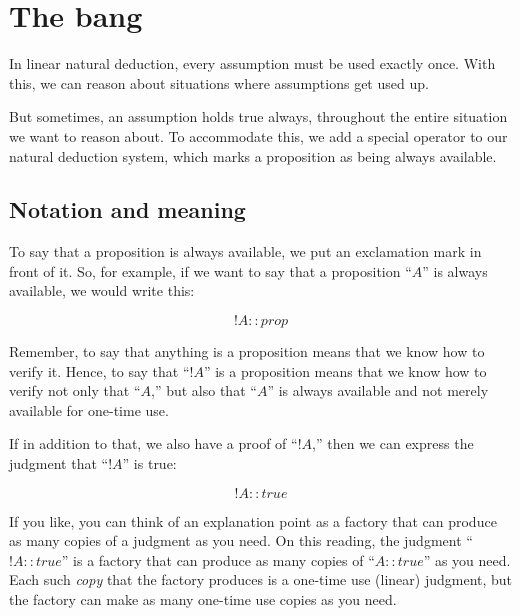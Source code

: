 \documentclass[../../../main.tex]{subfiles}
\begin{document}
\chapter{The bang}


In linear natural deduction, every assumption must be used exactly once. With this, we can reason about situations where assumptions get used up.

But sometimes, an assumption holds true always, throughout the entire situation we want to reason about. To accommodate this, we add a special operator to our natural deduction system, which marks a proposition as being always available.


\section{Notation and meaning}

To say that a proposition is always available, we put an exclamation mark in front of it. So, for example, if we want to say that a proposition ``$A$'' is always available, we would write this:

\begin{equation*}
  !A :: prop
\end{equation*}

\noindent
Remember, to say that anything is a proposition means that we know how to verify it. Hence, to say that ``$!A$'' is a proposition means that we know how to verify not only that ``$A$,'' but also that ``$A$'' is always available and not merely available for one-time use.

If in addition to that, we also have a proof of ``$!A$,'' then we can express the judgment that ``$!A$'' is true:

\begin{equation*}
  !A :: true
\end{equation*}

\noindent
If you like, you can think of an explanation point as a factory that can produce as many copies of a judgment as you need. On this reading, the judgment ``$!A :: true$'' is a factory that can produce as many copies of ``$A :: true$'' as you need. Each such \emph{copy} that the factory produces is a one-time use (linear) judgment, but the factory can make as many one-time use copies as you need.
\end{document}
